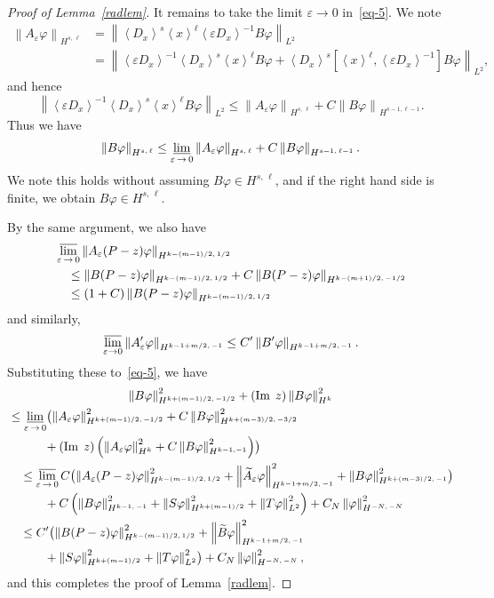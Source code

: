 \documentclass[AHL,Unicode,longabstracts,published]{cedram}
\newcommand*\e{\varepsilon}
\newcommand*\f{\varphi}
\DeclareMathOperator{\Iml}{Im\;}
\newcommand{\jap}[1]{\left\langle #1 \right\rangle}
\newcommand{\norm}[1]{\left\| #1 \right\|}
\newcommand{\bigpare}[1]{\bigl(#1\bigr)}
\let\oldtilde\tilde
\renewcommand*{\tilde}[1]{\mathchoice{\widetilde{#1}}{\widetilde{#1}}{\oldtilde{#1}}{\oldtilde{#1}}}
\begin{document}
\begin{proof}[Proof of Lemma~\ref{radlem}]
It remains to take the limit $\e\to 0$ in~\eqref{eq-5}. We note
\begin{align*}
\norm{A_\e \f}_{H^{s,\,\ell}} &=
\left\|\jap{D_x}^s\jap{x}^\ell \jap{\e D_x}^{-1}B\f\right\|_{L^2} \\
&= \left\|\jap{\e D_x}^{-1}\jap{D_x}^s\jap{x}^\ell B\f+
\jap{D_x}^s\left[\jap{x}^\ell, \jap{\e D_x}^{-1}\right]B\f\right\|_{L^2},
\end{align*}
and hence
\[
\left\|\jap{\e D_x}^{-1}\jap{D_x}^s\jap{x}^\ell B\f\right\|_{L^2}
\leq \norm{A_\e\f}_{H^{s,\,\ell}} + C\norm{B\f}_{H^{s-1,\ell-1}}.
\]
Thus we have
\[
\norm{B\f}_{H^{s,\,\ell}}\leq \varliminf_{\e\,\to\,0} \norm{A_\e\f}_{H^{s,\,\ell}} +C\norm{B\f}_{H^{s-1,\,\ell-1}}.
\]
We note this holds without assuming $B\f\in H^{s,\,\ell}$, and if the right hand side is finite, we obtain $B\f\in H^{s,\,\ell}$.

By the same argument, we also have
\begin{align*}
&\varlimsup_{\e\,\to\,0} \norm{A_\e(P-z)\f}_{H^{k-(m-1)/2,\,1/2} }\\
&\quad \leq \norm{B(P-z)\f}_{H^{k-(m-1)/2,\,1/2}} + C\norm{B(P-z)\f}_{H^{k-(m+1)/2,\,-1/2} }\\
&\quad \leq (1+C) \norm{B(P-z)\f}_{H^{k-(m-1)/2,\,1/2}}
\end{align*}
and similarly,
\[
\varlimsup_{\e\to 0} \norm{A_\e'\f}_{H^{k-1+m/2,\,-1} }
\leq C' \norm{B'\f}_{H^{k-1+m/2,\,-1} }.
\]
Substituting these to~\eqref{eq-5}, we have
\begin{multline*}
\norm{B\f}^2_{H^{k+(m-1)/2,\,-1/2}}+(\Iml z)\norm{B\f}^2_{H^{k}} \\
\begin{aligned}
&\leq \varliminf_{\e\,\to\,0} \bigpare{\norm{A_\e\f}^2_{H^{k+(m-1)/2,\,-1/2}} +C\norm{B\f}^2_{H^{k+(m-3)/2,\,-3/2}}\\
&\quad\quad\quad + (\Iml z)\left(\norm{A_\e\f}^2_{H^{k}}+C\norm{B\f}^2_{H^{k-1,-1}}\right)}\\
&\quad \leq \varlimsup_{\e\,\to\,0}C \bigpare{ \norm{A_\e(P-z)\f}^2_{H^{k-(m-1)/2,\,1/2}} +\norm{\tilde A_\e \f}^2_{H^{k-1+m/2,\,-1}}+\norm{B\f}^2_{H^{k+(m-3)/2,\,-1}}} \\
&\quad\quad\quad +C\left(\norm{B\f}^2_{H^{k-1,\,-1}}+\norm{S\f}^2_{H^{k+(m-1)/2}}+\norm{T\f}_{L^2}^2\right) +C_N \norm{\f}_{H^{-N,\,-N}}^2\\
&\quad \leq C'\bigpare{\norm{B(P-z)\f}_{H^{k-(m-1)/2,\,1/2}}^2 +\norm{\tilde B\f}_{H^{k-1+m/2,\,-1}}^2 \\
&\quad \quad \quad +\norm{S\f}_{H^{k+(m-1)/2}}^2 +\norm{T\f}_{L^2}^2} +C_N \norm{\f}_{H^{-N,\,-N}}^2,
\end{aligned}
\end{multline*}
and this completes the proof of Lemma~\ref{radlem}.
\end{proof}
\end{document}
